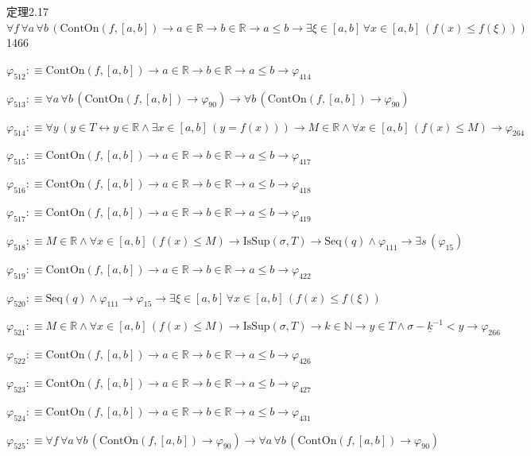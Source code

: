 \begin{fullproof}{定理2.17}{$\forall f\,\forall a\,\forall b\,(\mathrm{ContOn}(f,[a,b]) \to a \in \mathbb{R} \to b \in \mathbb{R} \to a \leq b \to \exists \xi \in [a,b]\,\forall x \in [a,b]\,(f(x) \leq f(\xi)))$}{1466}
\begin{abbrevlist}
\item $\varphi_{512} :\equiv \mathrm{ContOn}(f,[a,b]) \to a \in \mathbb{R} \to b \in \mathbb{R} \to a \leq b \to \varphi_{414}$
\item $\varphi_{513} :\equiv \forall a\,\forall b\,(\mathrm{ContOn}(f,[a,b]) \to \varphi_{90}) \to \forall b\,(\mathrm{ContOn}(f,[a,b]) \to \varphi_{90})$
\item $\varphi_{514} :\equiv \forall y\,(y \in T \leftrightarrow y \in \mathbb{R} \land \exists x \in [a,b]\,(y = f(x))) \to M \in \mathbb{R} \land \forall x \in [a,b]\,(f(x) \leq M) \to \varphi_{264}$
\item $\varphi_{515} :\equiv \mathrm{ContOn}(f,[a,b]) \to a \in \mathbb{R} \to b \in \mathbb{R} \to a \leq b \to \varphi_{417}$
\item $\varphi_{516} :\equiv \mathrm{ContOn}(f,[a,b]) \to a \in \mathbb{R} \to b \in \mathbb{R} \to a \leq b \to \varphi_{418}$
\item $\varphi_{517} :\equiv \mathrm{ContOn}(f,[a,b]) \to a \in \mathbb{R} \to b \in \mathbb{R} \to a \leq b \to \varphi_{419}$
\item $\varphi_{518} :\equiv M \in \mathbb{R} \land \forall x \in [a,b]\,(f(x) \leq M) \to \mathrm{IsSup}(\sigma,T) \to \mathrm{Seq}(q) \land \varphi_{111} \to \exists s\,(\varphi_{15})$
\item $\varphi_{519} :\equiv \mathrm{ContOn}(f,[a,b]) \to a \in \mathbb{R} \to b \in \mathbb{R} \to a \leq b \to \varphi_{422}$
\item $\varphi_{520} :\equiv \mathrm{Seq}(q) \land \varphi_{111} \to \varphi_{15} \to \exists \xi \in [a,b]\,\forall x \in [a,b]\,(f(x) \leq f(\xi))$
\item $\varphi_{521} :\equiv M \in \mathbb{R} \land \forall x \in [a,b]\,(f(x) \leq M) \to \mathrm{IsSup}(\sigma,T) \to k \in \mathbb{N} \to y \in T \land \sigma - \underline{k}^{-1} < y \to \varphi_{266}$
\item $\varphi_{522} :\equiv \mathrm{ContOn}(f,[a,b]) \to a \in \mathbb{R} \to b \in \mathbb{R} \to a \leq b \to \varphi_{426}$
\item $\varphi_{523} :\equiv \mathrm{ContOn}(f,[a,b]) \to a \in \mathbb{R} \to b \in \mathbb{R} \to a \leq b \to \varphi_{427}$
\item $\varphi_{524} :\equiv \mathrm{ContOn}(f,[a,b]) \to a \in \mathbb{R} \to b \in \mathbb{R} \to a \leq b \to \varphi_{431}$
\item $\varphi_{525} :\equiv \forall f\,\forall a\,\forall b\,(\mathrm{ContOn}(f,[a,b]) \to \varphi_{90}) \to \forall a\,\forall b\,(\mathrm{ContOn}(f,[a,b]) \to \varphi_{90})$

\end{abbrevlist}
\end{fullproof}
